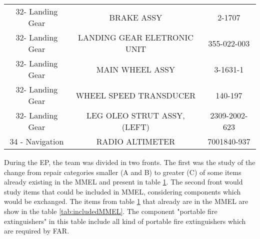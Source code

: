 \begin{table}[H]
\begin{tabular}{ccc}
    32- Landing Gear & BRAKE ASSY  & 2-1707 \\
    32- Landing Gear & LANDING GEAR ELETRONIC UNIT  & 355-022-003 \\
    32- Landing Gear & MAIN WHEEL ASSY  & 3-1631-1 \\
    32- Landing Gear & WHEEL SPEED TRANSDUCER  & 140-197 \\
    32- Landing Gear & LEG OLEO STRUT ASSY, (LEFT)  & 2309-2002-623 \\
    34 - Navigation & RADIO ALTIMETER & 7001840-937 \\
    \bottomrule
    \end{tabular}%
  \label{tab:tableURRMEL}%
\end{table}%


During the EP, the team was divided in two fronts. The first was the study of the change from repair categories smaller (A and B) to greater (C) of some items already existing in the MMEL and present in table \ref{tab:tableURRMEL}. The second front would study items that could be included in MMEL, considering components which would be exchanged.
The items from table \ref{tab:tableURRMEL} that already are in the MMEL are show in the table \ref{tab:includedMMEL}. The component "portable fire extinguishers" in this table include all kind of portable fire extinguishers which are required by FAR.

